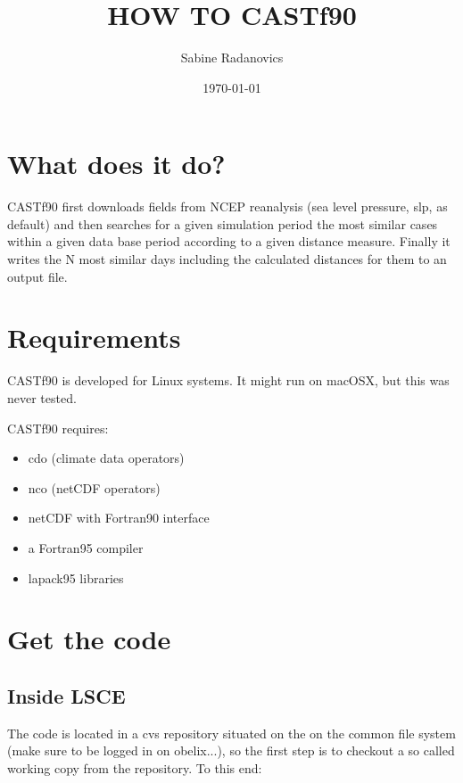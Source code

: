 \documentclass[11p,a4paper]{article}
\title{HOW TO CASTf90}
\author{Sabine Radanovics}
\date{\today}
\begin{document}
\maketitle
\section{What does it do?}
CASTf90 first downloads fields from NCEP reanalysis (sea level pressure, slp, as default) and then searches for a given simulation period the most similar cases within a given data base period according to a given distance measure. Finally it writes the N most similar days including the calculated distances for them to an output file. 
\section{Requirements}
CASTf90 is developed for Linux systems. It might run on macOSX, but this was never tested. 

CASTf90 requires:
\begin{itemize}
 \item cdo (climate data operators)
 \item nco (netCDF operators)
 \item netCDF with Fortran90 interface
 \item a Fortran95 compiler
 \item lapack95 libraries
\end{itemize}

\section{Get the code}
\subsection{Inside LSCE}
The code is  located in a cvs repository situated on the on the common file system (make sure to be logged in on obelix...), so the first step is to checkout a so called working copy from the repository.
To this end:
\end{document}
